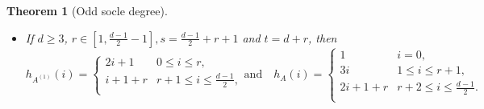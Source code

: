 \documentclass[12pt]{amsart}
\numberwithin{equation}{section}
\theoremstyle{plain} \newtheorem{theorem}{Theorem}[section]
\theoremstyle{definition} \newtheorem{definition}[theorem]{Definition}
\begin{document}
\begin{theorem}[Odd socle degree]
\begin{itemize}
\begin{itemize}
\begin{equation}
\begin{array}{ll}
                \end{array}
              \right.
 \end{equation}
\item otherwise
\begin{equation}\label{HFoddA(1,2)}
h_A(i)= \left\{
                \begin{array}{ll}
                   1 & i=0,\\
                  3i &  1\leq i\leq r,\\
                  2i+r+1& r+1\leq i\leq s-r-1,\\
                  2i+r+1& i=s-r, \hspace*{2mm}\text{if}\hspace*{2mm}t>2s-r\hspace*{2mm}\text{and}\hspace*{2mm}s>2r,\\
                  2i+r& i=s-r, \hspace*{2mm}\text{if}\hspace*{2mm}t>2s-r \hspace*{2mm}\text{and}\hspace*{2mm}s=2r,\\
                  i+s+1 & s-r+1\leq i\leq t-s-1,\\
                  t & t-s\leq i\leq \frac{d-1}{2}.\\
                \end{array}
              \right.
\end{equation}
 \end{itemize}
 \item[$(2)$] If $d\geq 3$, $r\in[1,\frac{d-1}{2}-1],s=\frac{d-1}{2}+r+1 $ and $t=d+r$, then 
\begin{equation}\label{HFodd(2)}
h_{A^{(1)}}(i)= \left\{
                \begin{array}{ll}
                  2i+1 &  0\leq i\leq r,\\
                  i+1+r & r+1\leq i\leq\frac{d-1}{2},\\
                \end{array}
              \right. \text{and}\quad h_{A}(i)= \left\{
                \begin{array}{ll}
                1& i=0,\\
                  3i &  1\leq i\leq r+1,\\
                  2i+1+r & r+2\leq i\leq\frac{d-1}{2}.\\
                \end{array}

\end{equation}
\end{itemize}
\end{theorem}
\end{document}
